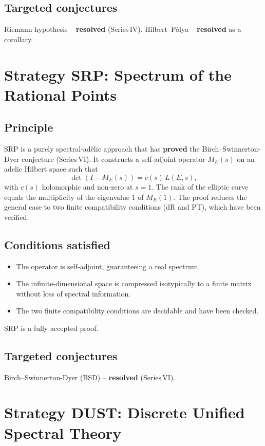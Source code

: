 \documentclass[11pt,a4paper]{article}
\begin{document}
\subsection{Targeted conjectures}
Riemann hypothesis – \textbf{resolved} (Series IV). Hilbert–Pólya – \textbf{resolved} as a corollary.

\section{Strategy SRP: Spectrum of the Rational Points}

\subsection{Principle}
SRP is a purely spectral‑adèlic approach that has \textbf{proved} the Birch–Swinnerton-Dyer conjecture (Series VI). It constructs a self‑adjoint operator \(M_E(s)\) on an adelic Hilbert space such that
\[
\det(I - M_E(s)) = c(s)\, L(E,s),
\]
with \(c(s)\) holomorphic and non‑zero at \(s=1\). The rank of the elliptic curve equals the multiplicity of the eigenvalue \(1\) of \(M_E(1)\). The proof reduces the general case to two finite compatibility conditions (dR and PT), which have been verified.

\subsection{Conditions satisfied}
\begin{itemize}
\item The operator is self‑adjoint, guaranteeing a real spectrum.
\item The infinite‑dimensional space is compressed isotypically to a finite matrix without loss of spectral information.
\item The two finite compatibility conditions are decidable and have been checked.
\end{itemize}
SRP is a fully accepted proof.

\subsection{Targeted conjectures}
Birch–Swinnerton-Dyer (BSD) – \textbf{resolved} (Series VI).

\section{Strategy DUST: Discrete Unified Spectral Theory}
\end{document}
